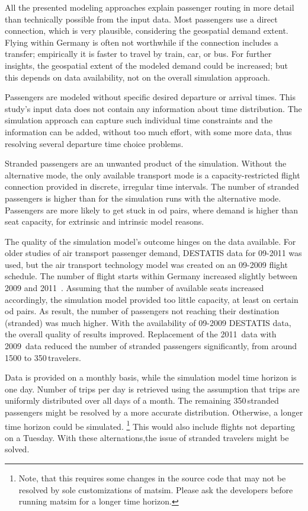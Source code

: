 All the presented modeling approaches explain passenger routing in more detail than technically possible from the input data.  
Most passengers use a direct connection, which is very plausible, considering the geospatial demand extent.  
Flying within Germany is often not worthwhile if the connection includes a transfer; 
empirically it is faster to travel by train, car, or bus. 
For further insights, the geospatial extent of the modeled demand could be increased; but this depends on data availability,  not on the overall simulation approach. 

Passengers are modeled without specific desired departure or arrival times. 
This study's input data does not contain any information about time distribution. 
The simulation approach can capture such individual time constraints and  
the information can be added, without too much effort, with some more data, thus 
resolving several departure time choice problems. 

Stranded passengers are an unwanted product of the simulation. 
Without the alternative mode, the only available transport mode is a capacity-restricted flight connection provided in discrete, irregular time intervals. 
The number of stranded passengers is higher than for the simulation runs with the alternative mode. 
Passengers are more likely to get stuck in \gls{od} pairs, where demand is higher than seat capacity, for 
extrinsic and intrinsic model reasons. 

The quality of the simulation model's outcome hinges on the data available.  
For older studies of air transport passenger demand, DESTATIS data for 09-2011 was used, but 
the air transport technology model was created on an 09-2009 flight schedule.  
The number of flight starts within Germany increased slightly between 2009 and 2011~\citep[][p.~23]{DLR2011Luftverkehrsbericht}. 
Assuming that the number of available seats increased accordingly, the simulation model provided too little capacity, at least on certain \gls{od} pairs. 
As result, the number of passengers not reaching their destination (stranded) was much higher.  
With the availability of 09-2009 DESTATIS data, the overall quality of results improved.  
Replacement of the 2011~data with 2009~data reduced the number of stranded passengers significantly, from around 1500 to 350\,travelers. 

Data is provided on a monthly basis, while the simulation model time horizon is one day. 
Number of trips per day is retrieved using the assumption that trips are uniformly distributed over all days of a month.  
The remaining 350\,stranded passengers might be resolved by a more accurate distribution. 
Otherwise, a longer time horizon could be simulated.%
\footnote{Note, that this requires some changes in the source code that may not be resolved by sole customizations of \gls{matsim}. Please ask the developers before running \gls{matsim} for a longer time horizon.} 
This would also include flights not departing on a Tuesday. 
With these alternations,the issue of stranded travelers might be solved. 

